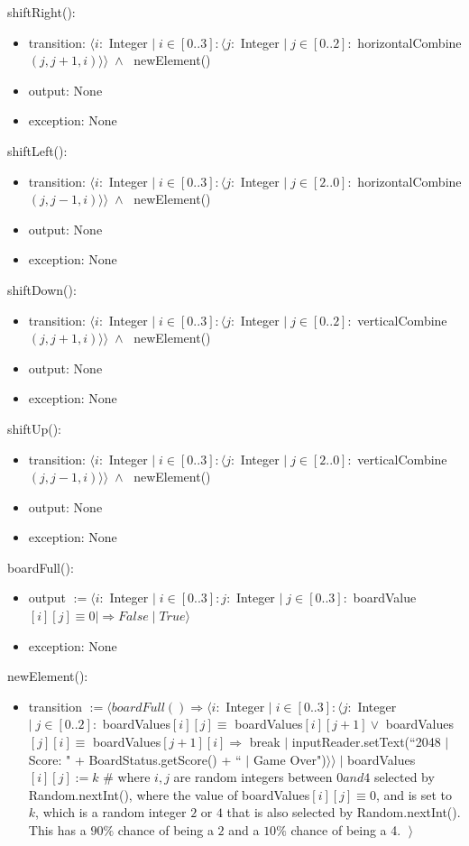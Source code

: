 \documentclass{article}
\begin{document}
shiftRight():
\begin{itemize}
    \item transition: $\langle i :$ Integer $ |\; i \in [0..3] : \langle j : $ Integer $ |\; j \in [0..2]: $ horizontalCombine$(j, j + 1, i) \rangle \rangle \; \land \;$ newElement()
    \item output: None
    \item exception: None
\end{itemize}
shiftLeft():
\begin{itemize}
    \item transition: $\langle i :$ Integer $ |\; i \in [0..3] : \langle j : $ Integer $ |\; j \in [2..0]: $ horizontalCombine$(j, j - 1, i) \rangle \rangle \; \land \;$ newElement()
    \item output: None
    \item exception: None
\end{itemize}
shiftDown():
\begin{itemize}
    \item transition: $\langle i :$ Integer $ |\; i \in [0..3] : \langle j : $ Integer $ |\; j \in [0..2]: $ verticalCombine$(j, j + 1, i) \rangle \rangle \; \land \;$ newElement()
    \item output: None
    \item exception: None
\end{itemize}
shiftUp():
\begin{itemize}
    \item transition: $\langle i :$ Integer $ |\; i \in [0..3] : \langle j : $ Integer $ |\; j \in [2..0]: $ verticalCombine$(j, j - 1, i) \rangle \rangle \; \land \;$ newElement()
    \item output: None
    \item exception: None
\end{itemize}
boardFull():
\begin{itemize}
    \item output $:= \langle i :$ Integer $ |\; i \in [0..3] : j : $ Integer $ |\; j \in [0..3]: $ boardValue$[i][j] \equiv 0 | \Rightarrow False \;| \; True\rangle$
    \item exception: None
\end{itemize}
newElement():
\begin{itemize}
    \item transition $:= \langle boardFull() \Rightarrow \langle i :$ Integer $ |\; i \in [0..3] : \langle j : $ Integer $ |\; j \in [0..2]: $ boardValues$[i][j] \equiv $ boardValues$[i][j +1] \lor $ boardValues$[j][i] \equiv $ boardValues$[j+1][i] \Rightarrow$ break $|$ inputReader.setText(``2048 $|$ Score: " +  BoardStatus.getScore() + `` $|$ Game Over")$ \rangle \rangle \; |$ boardValues$[i][j] := k$ $\#$ where $i,j$ are random integers between $0 and 4$ selected by Random.nextInt(), where the value of boardValues$[i][j] \equiv 0$, and is set to $k$, which is a random integer $2$ or $4$ that is also selected by Random.nextInt(). This has a $90\%$ chance of being a $2$ and a $10\%$ chance of being a 4. $ \; \rangle$
\end{itemize}
\end{document}

